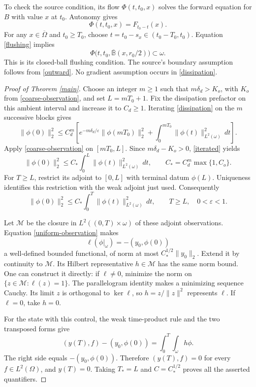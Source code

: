 \documentclass[11pt]{article}
\theoremstyle{remark}
\newcommand{\eps}{\varepsilon}
\begin{document}
To check the source condition, its flow $\Phi(t,t_0,x)$ solves the forward
equation for $B$ with value $x$ at $t_0$. Autonomy gives
\[
 \Phi(t,t_0,x)=F_{t_0-t}(x).
\]
For any $x\in\overline\Omega$ and $t_0\ge T_0$, choose
$t=t_0-s_x\in(t_0-T_0,t_0)$. Equation \eqref{flushing} implies
\[
 \Phi\bigl(t,t_0,\overline{\mathbb B}(x,r_0/2)\bigr)\subset\omega.
\]
This is its closed-ball flushing condition. The source's boundary assumption
follows from \eqref{outward}. No gradient assumption occurs in
\eqref{dissipation}.

\begin{proof}[Proof of Theorem \ref{main}]
Choose an integer $m\ge1$ such that $m\delta_d>K_o$, with $K_o$ from
\eqref{coarse-observation}, and set $L=mT_0+1$. Fix the dissipation
prefactor on this ambient interval and increase it to $C_d\ge1$.
Iterating \eqref{dissipation} on the $m$ successive blocks gives
\begin{equation}\label{iterated}
 \|\phi(0)\|_2^2\le C_d^m\left[
 e^{-m\delta_d/\eps}\|\phi(mT_0)\|_2^2+
                     \int_0^{mT_0}\|\phi(t)\|_{L^2(\omega)}^2\,dt\right].
\end{equation}
Apply \eqref{coarse-observation} on $[mT_0,L]$. Since
$m\delta_d-K_o>0$, \eqref{iterated} yields
\[
 \|\phi(0)\|_2^2\le C_*\int_0^L\|\phi(t)\|_{L^2(\omega)}^2\,dt,
 \qquad C_*=C_d^m\max\{1,C_o\}.
\]
For $T\ge L$, restrict its adjoint to $[0,L]$ with terminal datum
$\phi(L)$. Uniqueness identifies this restriction with the weak adjoint
just used. Consequently
\begin{equation}\label{uniform-observation}
 \|\phi(0)\|_2^2\le C_*\int_0^T\|\phi(t)\|_{L^2(\omega)}^2\,dt,
 \qquad T\ge L,\quad 0<\eps<1.
\end{equation}

Let $\mathcal M$ be the closure in $L^2((0,T)\times\omega)$ of these
adjoint observations. Equation \eqref{uniform-observation} makes
\[
 \ell(\phi|_\omega)=-(y_0,\phi(0))
\]
a well-defined bounded functional, of norm at most
$C_*^{1/2}\|y_0\|_2$. Extend it by continuity to $\mathcal M$.
Its Hilbert representative $h\in\mathcal M$ has the same norm bound.
One can construct it directly: if $\ell\ne0$, minimize the norm on
$\{z\in\mathcal M:\ell(z)=1\}$. The parallelogram identity makes a
minimizing sequence Cauchy. Its limit $z$ is orthogonal to $\ker\ell$,
so $h=z/\|z\|^2$ represents $\ell$. If $\ell=0$, take $h=0$.

For the state with this control, the weak time-product rule and the two
transposed forms give
\[
 (y(T),f)-(y_0,\phi(0))=\int_0^T\int_\omega h\phi.
\]
The right side equals $-(y_0,\phi(0))$. Therefore $(y(T),f)=0$ for every
$f\in L^2(\Omega)$, and $y(T)=0$. Taking $T_*=L$ and $C=C_*^{1/2}$ proves
all the asserted quantifiers.
\end{proof}
\end{document}
